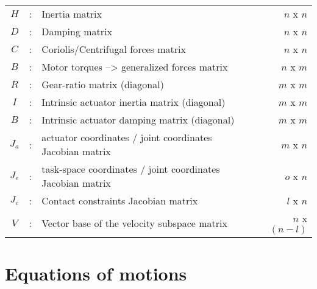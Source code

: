 \begin{table}[htbp]
\begin{tabular}{ c c l r }
			$H$             &  :  & Inertia matrix                                             & $n$ x $n$ \\
			$D$             &  :  & Damping matrix                                             & $n$ x $n$ \\
			$C$             &  :  & Coriolis/Centrifugal forces matrix                         & $n$ x $n$ \\
			$B$             &  :  & Motor torques --> generalized forces matrix                & $n$ x $m$ \\
			$R$             &  :  & Gear-ratio matrix (diagonal)                               & $m$ x $m$ \\
			$I$             &  :  & Intrinsic actuator inertia matrix (diagonal)               & $m$ x $m$ \\
			$B$             &  :  & Intrinsic actuator damping matrix (diagonal)               & $m$ x $m$ \\
			$J_a$           &  :  & actuator coordinates / joint coordinates Jacobian matrix   & $m$ x $n$ \\
			$J_e$           &  :  & task-space coordinates / joint coordinates Jacobian matrix & $o$ x $n$ \\
			$J_c$           &  :  & Contact constraints Jacobian matrix                        & $l$ x $n$ \\ 
			$V$             &  :  & Vector base of the velocity subspace matrix                & $n$ x $(n-l)$ \\ 
		\hline \hline
        \end{tabular}		
	\label{tab:nom}
\end{table}

\section{Equations of motions}
\label{sec:eom}

